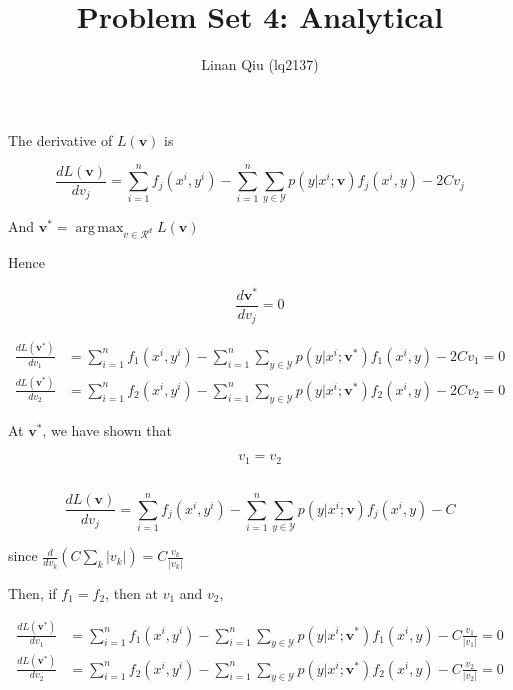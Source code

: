 \documentclass[11pt]{scrartcl}
\title{Problem Set 4: Analytical}
\author{Linan Qiu (lq2137)}
\DeclareMathOperator*{\argmax}{arg\,max}
\newcommand{\vstar}{\ensuremath{\mathbf{v}^*}}
\newcommand{\vvec}{\ensuremath{\mathbf{v}}}
\begin{document}
\maketitle

\section{}
\subsection{}

The derivative of $L(\mathbf{v})$ is 

\[ \frac{d L(\vvec)}{d v_j} = \sum_{i=1}^{n} f_j \left(x^i, y^i \right) - \sum_{i=1}^{n} \sum_{y \in \mathcal{Y}} p\left(y | x^i; \vvec \right) f_j \left(x^i, y\right) - 2C v_j \]

And $\mathbf{v}^* = \argmax_{v\in \mathcal{R}^d} L(\mathbf{v})$

Hence 

\[ \frac{d \vstar}{d v_j} = 0\]

\begin{align*}
\frac{d L(\vstar)}{d v_1} &= \sum_{i=1}^{n} f_1 \left(x^i, y^i \right) - \sum_{i=1}^{n} \sum_{y \in \mathcal{Y}} p\left(y | x^i; \vstar \right) f_1 \left(x^i, y\right) - 2C v_1 = 0 \\ 
\frac{d L(\vstar)}{d v_2} &= \sum_{i=1}^{n} f_2 \left(x^i, y^i \right) - \sum_{i=1}^{n} \sum_{y \in \mathcal{Y}} p\left(y | x^i; \vstar \right) f_2 \left(x^i, y\right) - 2C v_2 = 0
\end{align*}

At $\vstar$, we have shown that

\[ v_1 = v_2 \]

\subsection{}

\[ \frac{d L(\vvec)}{d v_j} = \sum_{i=1}^{n} f_j \left(x^i, y^i \right) - \sum_{i=1}^{n} \sum_{y \in \mathcal{Y}} p\left(y | x^i; \vvec \right) f_j \left(x^i, y\right) - C \]

since $ \frac{d}{d v_k} \left( C \sum_k |v_k| \right)= C \frac{v_k}{|v_k|} $

Then, if $f_1 = f_2$, then at $v_1$ and $v_2$,
 
\begin{align*}
\frac{d L(\vstar)}{d v_1} &= \sum_{i=1}^{n} f_1 \left(x^i, y^i \right) - \sum_{i=1}^{n} \sum_{y \in \mathcal{Y}} p\left(y | x^i; \vstar \right) f_1 \left(x^i, y\right) - C \frac{v_1}{|v_1|} = 0 \\ 
\frac{d L(\vstar)}{d v_2} &= \sum_{i=1}^{n} f_2 \left(x^i, y^i \right) - \sum_{i=1}^{n} \sum_{y \in \mathcal{Y}} p\left(y | x^i; \vstar \right) f_2 \left(x^i, y\right) - C \frac{v_2}{|v_2|} = 0
\end{align*}
\end{document}
